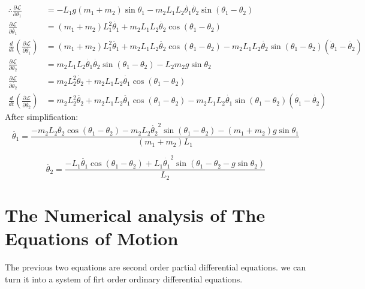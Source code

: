 \documentclass[11]{article}
\begin{document}
\begin{align}
\therefore \frac{\partial\mathcal{L}}{\partial \theta_{1}}&=-L_{1}g(m_{1}+m_{2})\sin\theta_{1}-m_{2}L_{1}L_{2}\dot{\theta_{1}}\dot{\theta_{2}}\sin(\theta_{1}-\theta_{2})\\
\frac{\partial \mathcal{L}}{\partial\dot{\theta_{1}}}&=(m_{1}+m_{2})L_{1}^{2}\dot{\theta_{1}}+m_{2}L_{1}L_{2}\dot{\theta_{2}}\cos(\theta_{1}-\theta_{2})\\
\frac{d}{dt}\left(\frac{\partial \mathcal{L}}{\partial \dot{\theta_{1}}}\right)&=(m_{1}+m_{2})L_{1}^{2}\ddot{\theta_{1}}+m_{2}L_{1}L_{2}\ddot{\theta_{2}}\cos(\theta_{1}-\theta_{2})-m_{2}L_{1}L_{2}\dot{\theta_{2}}\sin(\theta_{1}-\theta_{2})(\dot
\theta_{1}-\dot{\theta_{2}})\\
\frac{\partial \mathcal{L}}{\partial \theta_{2}}&= m_{2}L_{1}L_{2}\dot{\theta_{1}}\dot{\theta_{2}}\sin(\theta_{1}-\theta_{2})-L_{2}m_{2}g\sin\theta_{2}\\
\frac{\partial \mathcal{L}}{\partial \dot{\theta_{2}}}&= m_{2}L_{2}^{2}\dot{\theta_{2}}+m_{2}L_{1}L_{2}\dot{\theta_{1}}\cos(\theta_{1}-\theta_{2})\\
\frac{d}{dt}\left(\frac{\partial \mathcal{L}}{\partial \dot{\theta_{2}}}\right)&= m_{2}L_{2}^{2}\ddot{\theta_{2}}+m_{2}L_{1}L_{2}\ddot{\theta_{1}}\cos(\theta_{1}-\theta_{2})-m_{2}L_{1}L_{2}\dot{\theta_{1}}\sin(\theta_{1}-\theta_{2})(\dot{\theta_{1}}-\dot{\theta_{2}})
\end{align}
\noindent After simplification:
$$\ddot{\theta_{1}}=\frac{-m_{2}L_{2}\ddot{\theta_{2}}\cos(\theta_{1}-\theta_{2})-m_{2}L_{2}\dot{\theta_{2}}^{2}\sin(\theta_{1}-\theta_{2})-(m_{1}+m_{2})g\sin\theta_{1}}{(m_{1}+m_{2})L_{1}}$$

$$\ddot{\theta_{2}}=\frac{-L_{1}\ddot{\theta_{1}}\cos(\theta_{1}-\theta_{2})+L_{1}\dot{\theta_{1}}^{2}\sin(\theta_{1}-\theta_{2}-g\sin\theta_{2})}{L_{2}}$$

\newpage

\section{The Numerical analysis of The Equations of Motion}

The previous two equations are second order partial differential equations. we can turn it into a system of firt order ordinary differential equations.\\
\end{document}
